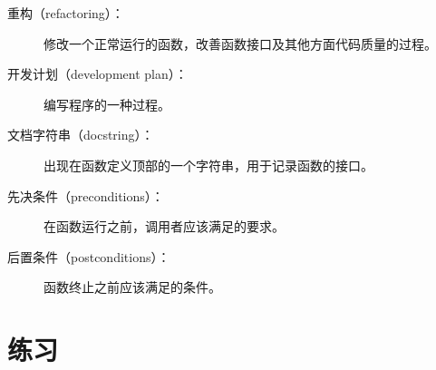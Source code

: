 \begin{description}
\item[重构（refactoring）：]
    修改一个正常运行的函数，改善函数接口及其他方面代码质量的过程。


\item[开发计划（development plan）：]
    编写程序的一种过程。


\item[文档字符串（docstring）：]
    出现在函数定义顶部的一个字符串，用于记录函数的接口。


\item[先决条件（preconditions）：]
    在函数运行之前，调用者应该满足的要求。


\item[后置条件（postconditions）：]
    函数终止之前应该满足的条件。

\end{description}


\section{练习}

